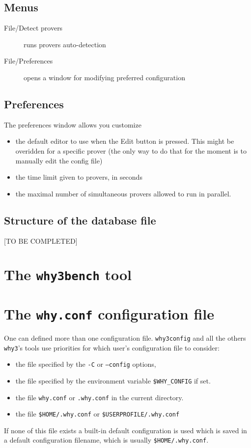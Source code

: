 \subsection{Menus}

\begin{description}
\item[File/Detect provers] runs provers auto-detection
\item[File/Preferences] opens a window for modifying preferred configuration
\end{description}

\subsection{Preferences}

The preferences window allows you customize
\begin{itemize}
\item the default editor to use when the \textsf{Edit} button is
  pressed. This might be overidden for a specific prover (the only way
  to do that for the moment is to manually edit the config file)
\item the time limit given to provers, in seconds
\item the maximal number of simultaneous provers allowed to run in parallel. 
\end{itemize}


\subsection{Structure of the database file}

[TO BE COMPLETED]

\section{The \texttt{why3bench} tool}

\section{The \texttt{why.conf} configuration file}
\label{sec:whyconffile}
One can defined more than one configuration file. \texttt{why3config}
and all the others \texttt{why3}'s tools use priorities for which
user's configuration file to consider:
\begin{itemize}
\item the file specified by the \texttt{-C} or \texttt{--config} options,
\item the file specified by the environment variable
  \texttt{\$WHY\_CONFIG} if set.
\item the file \texttt{why.conf} or \texttt{.why.conf} in the current
  directory.
\item the file \texttt{\$HOME/.why.conf} or \texttt{\$USERPROFILE/.why.conf}
\end{itemize}
If none of this file exists a built-in default configuration is used
which is saved in a default configuration filename, which is usually
\texttt{\$HOME/.why.conf}.

